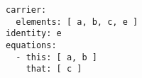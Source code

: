 \begin{verbatim}
carrier:
  elements: [ a, b, c, e ]
identity: e
equations:
  - this: [ a, b ]
    that: [ c ]


\end{verbatim}